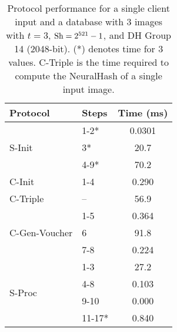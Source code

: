 \begin{table}[t]
	\caption{Protocol performance for a single client input and a database with 3 images with $t = 3$, $\text{Sh} = 2^{521}-1$, and DH Group 14 (2048-bit). (*) denotes time for 3 values. {\sf C-Triple} is the time required to compute the NeuralHash of a single input image.}
	\label{tab:performance}
	\centering

	\begin{tabular}{ll|c}
	\toprule
	\textbf{Protocol} & \textbf{Steps} & \textbf{Time (ms)} \\
		\midrule
		\midrule

		 & 1-2*& 0.0301\\
		{\sf S-Init} & 3*& 20.7\\
		 & 4-9*& 70.2\\
		\midrule

		{\sf C-Init} & 1-4& 0.290 \\
		\midrule
		{\sf C-Triple} & --& 56.9 \\
		\midrule
		&  1-5 &0.364 \\
		{\sf C-Gen-Voucher}&  6 &  91.8 \\
		&  7-8  & 0.224 \\

		\midrule
		\multirow{4}{*}{\sf S-Proc}&1-3  &27.2 \\
		&4-8  & 0.103\\
		&9-10  & 0.000\\
		&11-17*  & 0.840\\

	\bottomrule
	\end{tabular}
\end{table}